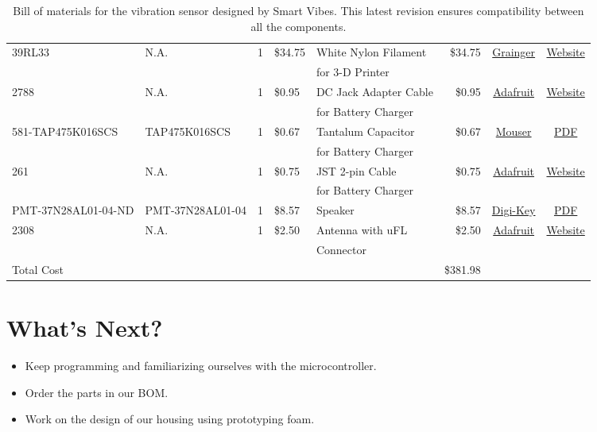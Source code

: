 \documentclass[12pt]{article}
\begin{document}
\begin{table}[H]
{\begin{tabular}{l|l|c|l|l|r|c|c}
    	 39RL33 & N.A. & 1 & \$34.75 & White Nylon Filament & \$34.75 & \href{https://www.grainger.com/product/FILABOT-White-Filament-39RL33}{Grainger} & \href{https://www.grainger.com/product/FILABOT-White-Filament-39RL33}{Website} \\
    	 & & & & for 3-D Printer & & \\
    	 2788 & N.A. & 1 & \$0.95 & DC Jack Adapter Cable & \$0.95 & \href{https://www.adafruit.com/products/2788}{Adafruit} & \href{https://www.adafruit.com/products/2788}{Website} \\
    	 & & & & for Battery Charger & & & \\
    	 581-TAP475K016SCS & TAP475K016SCS & 1 & \$0.67 & Tantalum Capacitor & \$0.67 & \href{http://www.mouser.com/ProductDetail/AVX/TAP475K016SCS/?qs=sGAEpiMZZMtZ1n0r9vR22d\%252b8XmbM9QM8L4TTXY3LGQ8\%3d}{Mouser} & \href{http://www.mouser.com/ds/2/40/tap-776819.pdf}{PDF} \\
    	 & & & & for Battery Charger & & & \\
    	 261 & N.A. & 1 & \$0.75 & JST 2-pin Cable & \$0.75 & \href{https://www.adafruit.com/product/261}{Adafruit} & \href{https://www.adafruit.com/product/261}{Website} \\
    	 & & & & for Battery Charger & & & \\
    	 	PMT-37N28AL01-04-ND & PMT-37N28AL01-04 & 1 & \$8.57 & Speaker & \$8.57 & \href{http://www.digikey.com/product-detail/en/peerless-by-tymphany/PMT-37N28AL01-04/PMT-37N28AL01-04-ND/6211115}{Digi-Key} & \href{http://www.tymphany.com/wp-content/themes/pathfinders/cache/pdfs/PMT-37N28AL01-04.pdf}{PDF} \\
        2308 & N.A. & 1 & \$2.50 & Antenna with uFL & \$2.50 & \href{https://www.adafruit.com/products/2308}{Adafruit} & \href{https://www.adafruit.com/products/2308}{Website} \\
    	 & & & & Connector & & & \\ \hline
    	Total Cost & & & & & \$381.98 &
	\end{tabular}%
	}
    \caption{Bill of materials for the vibration sensor designed by Smart Vibes. This latest revision ensures compatibility between all the components.}
    \label{tab:bom}
\end{table}

\section{What's Next?}
\begin{itemize}
\item Keep programming and familiarizing ourselves with the microcontroller.
\item Order the parts in our BOM.
\item Work on the design of our housing using prototyping foam.
\end{itemize}
\end{document}
